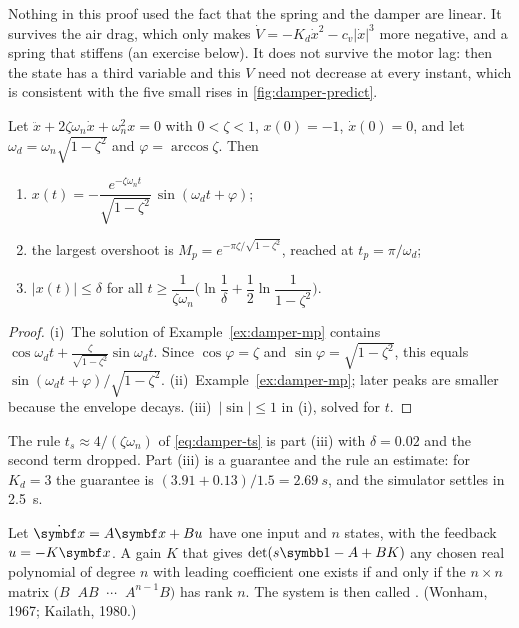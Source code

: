 Nothing in this proof used the fact that the spring and the damper are linear. It survives the air drag, which only makes $\dot V = -K_d\dot x^2 - c_v|\dot x|^3$ more negative, and a spring that stiffens (an exercise below). It does not survive the motor lag: then the state has a third variable and this $V$ need not decrease at every instant, which is consistent with the five small rises in \cref{fig:damper-predict}.

\begin{theorem}
\label{thm:damper-step}
Let $\ddot x + 2\zeta\omega_n\dot x + \omega_n^2 x = 0$ with $0 < \zeta < 1$, $x(0) = -1$, $\dot x(0) = 0$, and let $\omega_d = \omega_n\sqrt{1 - \zeta^2}$ and $\varphi = \arccos\zeta$. Then
\begin{enumerate}[label=(\roman*)]
  \item $x(t) = -\dfrac{e^{-\zeta\omega_n t}}{\sqrt{1 - \zeta^2}}\,\sin(\omega_d t + \varphi)$;
  \item the largest overshoot is $M_p = e^{-\pi\zeta/\sqrt{1 - \zeta^2}}$, reached at $t_p = \pi/\omega_d$;
  \item $|x(t)| \le \delta$ for all $t \ge \dfrac{1}{\zeta\omega_n}\Big(\ln\dfrac{1}{\delta} + \dfrac12\ln\dfrac{1}{1 - \zeta^2}\Big)$.
\end{enumerate}
\end{theorem}
\begin{proof}
(i)~The solution of Example~\ref{ex:damper-mp} contains $\cos\omega_d t + \frac{\zeta}{\sqrt{1 - \zeta^2}}\sin\omega_d t$. Since $\cos\varphi = \zeta$ and $\sin\varphi = \sqrt{1 - \zeta^2}$, this equals $\sin(\omega_d t + \varphi)/\sqrt{1 - \zeta^2}$. (ii)~Example~\ref{ex:damper-mp}; later peaks are smaller because the envelope decays. (iii)~$|\sin| \le 1$ in (i), solved for $t$.
\end{proof}

The rule $t_s \approx 4/(\zeta\omega_n)$ of \cref{eq:damper-ts} is part (iii) with $\delta = 0.02$ and the second term dropped. Part (iii) is a guarantee and the rule an estimate: for $K_d = 3$ the guarantee is $(3.91 + 0.13)/1.5 = \SI{2.69}{s}$, and the simulator settles in \SI{2.5}{s}.

\begin{theorem}
\label{thm:damper-placement}
Let $\dot{\vx} = A\vx + B u$ have one input and $n$ states, with the feedback $u = -K\vx$. A gain $K$ that gives $\det(s\Id - A + BK)$ any chosen real polynomial of degree $n$ with leading coefficient one exists if and only if the $n \times n$ matrix $\big(B \;\; AB \;\; \cdots \;\; A^{n-1}B\big)$ has rank $n$. The system is then called . (Wonham, 1967; Kailath, 1980.)
\end{theorem}

